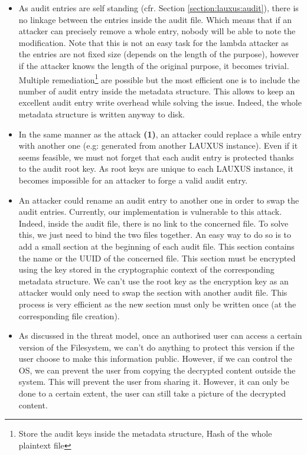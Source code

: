 \documentclass[../main.tex]{subfiles}
\begin{document}
\begin{itemize}
    \item[\textbf{(1)}] As audit entries are self standing (cfr. Section \ref{section:lauxus:audit}), there is no linkage between the entries inside the audit file. Which means that if an attacker can precisely remove a whole entry, nobody will be able to note the modification. Note that this is not an easy task for the lambda attacker as the entries are not fixed size (depends on the length of the purpose), however if the attacker knows the length of the original purpose, it becomes trivial. Multiple remediation\footnote{Store the audit keys inside the metadata structure, Hash of the whole plaintext file} are possible but the most efficient one is to include the number of audit entry inside the metadata structure. This allows to keep an excellent audit entry write overhead while solving the issue. Indeed, the whole metadata structure is written anyway to disk.
    \item[\textbf{(2)}] In the same manner as the attack \textbf{(1)}, an attacker could replace a while entry with another one (e.g: generated from another LAUXUS instance). Even if it seems feasible, we must not forget that each audit entry is protected thanks to the audit root key. As root keys are unique to each LAUXUS instance, it becomes impossible for an attacker to forge a valid audit entry.
    \item[\textbf{(3)}] An attacker could rename an audit entry to another one in order to swap the audit entries. Currently, our implementation is vulnerable to this attack. Indeed, inside the audit file, there is no link to the concerned file. To solve this, we just need to bind the two files together. An easy way to do so is to add a small section at the beginning of each audit file. This section contains the name or the UUID of the concerned file. This section must be encrypted using the key stored in the cryptographic context of the corresponding metadata structure. We can't use the root key as the encryption key as an attacker would only need to swap the section with another audit file. This process is very efficient as the new section must only be written once (at the corresponding file creation).
    \item[\textbf{(4)}] As discussed in the threat model, once an authorised user can access a certain version of the Filesystem, we can't do anything to protect this version if the user choose to make this information public. However, if we can control the OS, we can prevent the user from copying the decrypted content outside the system. This will prevent the user from sharing it. However, it can only be done to a certain extent, the user can still take a picture of the decrypted content.

\end{itemize}
\end{document}
